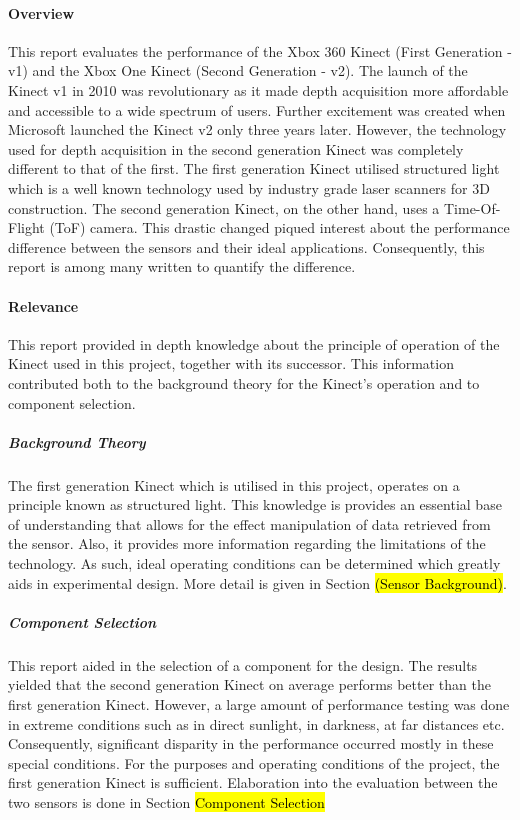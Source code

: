 \paragraph{Overview}
This report evaluates the performance of the Xbox 360 Kinect (First Generation - v1) and the Xbox One Kinect (Second Generation - v2). The launch of the Kinect v1 in 2010 was revolutionary as it made depth acquisition more affordable and accessible to a wide spectrum of users. Further excitement was created when Microsoft launched the Kinect v2 only three years later. However, the technology used for depth acquisition in the second generation Kinect was completely different to that of the first. The first generation Kinect utilised structured light which is a well known technology used by industry grade laser scanners for 3D construction. The second generation Kinect, on the other hand, uses a Time-Of-Flight (ToF) camera. This drastic changed piqued interest about the performance difference between the sensors and their ideal applications. Consequently, this report is among many written to quantify the difference. 

\paragraph{Relevance}
This report provided in depth knowledge about the principle of operation of the Kinect used in this project, together with its successor. This information contributed both to the background theory for the Kinect's operation and to component selection.

\subparagraph{Background Theory}
The first generation Kinect which is utilised in this project, operates on a principle known as structured light. This knowledge is provides an essential base of understanding that allows for the effect manipulation of data retrieved from the sensor. Also, it provides more information regarding the limitations of the technology. As such, ideal operating conditions can be determined which greatly aids in experimental design. More detail is given in Section \hl{(Sensor Background)}.

\subparagraph{Component Selection}
This report aided in the selection of a component for the design. The results yielded that the second generation Kinect on average performs better than the first generation Kinect. However, a large amount of performance testing was done in extreme conditions such as in direct sunlight, in darkness, at far distances etc. Consequently, significant disparity in the performance occurred mostly in these special conditions. For the purposes and operating conditions of the project, the first generation Kinect is sufficient. Elaboration into the evaluation between the two sensors is done in Section \hl{Component Selection} 

